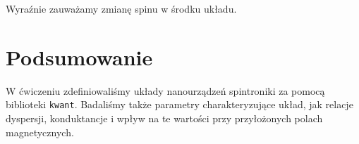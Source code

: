 \documentclass{article}
\begin{document}
Wyraźnie zauważamy zmianę spinu w środku układu.
\newpage
\section{Podsumowanie}
W ćwiczeniu zdefiniowaliśmy układy nanourządzeń spintroniki za pomocą biblioteki \texttt{kwant}.
Badaliśmy także parametry charakteryzujące układ, jak relacje dyspersji, konduktancje i wpływ na te wartości przy przyłożonych polach magnetycznych.
\end{document}
